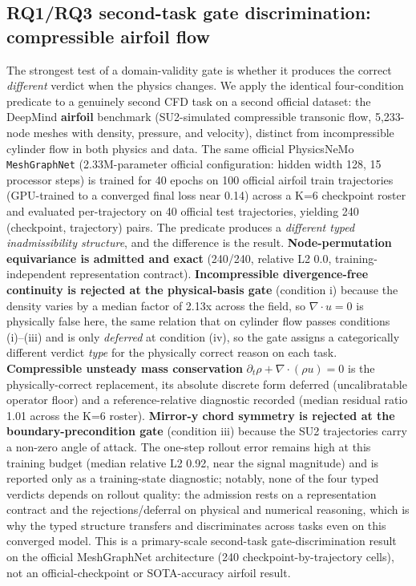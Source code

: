 \documentclass[preprint,12pt]{elsarticle}
\begin{document}
\subsection{RQ1/RQ3 second-task gate discrimination: compressible airfoil flow}
\label{subsec:second-task}

The strongest test of a domain-validity gate is whether it produces the correct \emph{different} verdict when the physics changes. We apply the identical four-condition predicate to a genuinely second CFD task on a second official dataset: the DeepMind \textbf{airfoil} benchmark (SU2-simulated compressible transonic flow, 5{,}233-node meshes with density, pressure, and velocity), distinct from incompressible cylinder flow in both physics and data. The same official PhysicsNeMo \texttt{MeshGraphNet} (2.33M-parameter official configuration: hidden width 128, 15 processor steps) is trained for 40 epochs on 100 official airfoil train trajectories (GPU-trained to a converged final loss near 0.14) across a K=6 checkpoint roster and evaluated per-trajectory on 40 official test trajectories, yielding 240 (checkpoint, trajectory) pairs. The predicate produces a \emph{different typed inadmissibility structure}, and the difference is the result. \textbf{Node-permutation equivariance is admitted and exact} (240/240, relative L2 0.0, training-independent representation contract). \textbf{Incompressible divergence-free continuity is rejected at the physical-basis gate} (condition i) because the density varies by a median factor of 2.13x across the field, so $\nabla\cdot u=0$ is physically false here, the same relation that on cylinder flow passes conditions (i)--(iii) and is only \emph{deferred} at condition (iv), so the gate assigns a categorically different verdict \emph{type} for the physically correct reason on each task. \textbf{Compressible unsteady mass conservation} $\partial_t\rho+\nabla\cdot(\rho u)=0$ is the physically-correct replacement, its absolute discrete form deferred (uncalibratable operator floor) and a reference-relative diagnostic recorded (median residual ratio 1.01 across the K=6 roster). \textbf{Mirror-y chord symmetry is rejected at the boundary-precondition gate} (condition iii) because the SU2 trajectories carry a non-zero angle of attack. The one-step rollout error remains high at this training budget (median relative L2 0.92, near the signal magnitude) and is reported only as a training-state diagnostic; notably, none of the four typed verdicts depends on rollout quality: the admission rests on a representation contract and the rejections/deferral on physical and numerical reasoning, which is why the typed structure transfers and discriminates across tasks even on this converged model. This is a primary-scale second-task gate-discrimination result on the official MeshGraphNet architecture (240 checkpoint-by-trajectory cells), not an official-checkpoint or SOTA-accuracy airfoil result.
\end{document}
